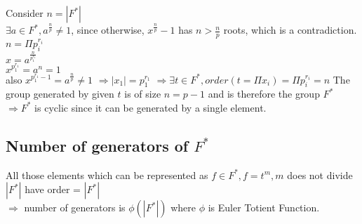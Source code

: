 \documentclass{article}
\begin{document}
\\
\\Consider $n = |F^*|$
\\$\exists a \in F^*, a^{\frac{n}{p}} \neq 1$, since otherwise, $x^{\frac{n}{p}} - 1$ has $n > \frac{n}{p}$ roots, which is a contradiction. 
\\$n = \Pi p_i^{r_i}$
\\ $x = a^{\frac{n}{p_1^{r_1}}} $
\\ $x^{p_1^{r_1}} = a^n = 1$
\\ also $x^{p_1^{r_1}-1} = a^{\frac{n}{p}} \neq 1$
$\Rightarrow |x_1| = p_1^{r_1}$
$\Rightarrow \exists t \in F^*, order(t = \Pi x_i) = \Pi p_i^{r_i} = n$
The group generated by given $t$ is of size $n = p-1$ and is therefore the group $F^*$
\\ $\Rightarrow F^*$ is cyclic since it can be generated by a single element.
\subsection{Number of generators of $F^*$}
All those elements which can be represented as $f \in F^*, f = t^m, m $ does not divide $|F^*|$ have order = $|F^*|$
\\ $\Rightarrow $ number of generators is $\phi(|F^*|)$ where $\phi$ is Euler Totient Function.
\end{document}
